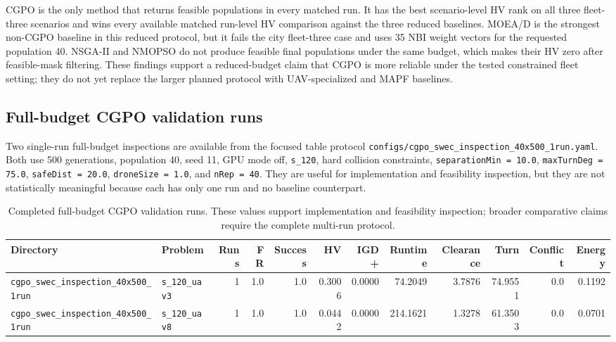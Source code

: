 \documentclass[a4paper,fleqn]{cas-dc}
\begin{document}
CGPO is the only method that returns feasible populations in every matched run. It has the best scenario-level HV rank on all three fleet-three scenarios and wins every available matched run-level HV comparison against the three reduced baselines. MOEA/D is the strongest non-CGPO baseline in this reduced protocol, but it fails the city fleet-three case and uses 35 NBI weight vectors for the requested population 40. NSGA-II and NMOPSO do not produce feasible final populations under the same budget, which makes their HV zero after feasible-mask filtering. These findings support a reduced-budget claim that CGPO is more reliable under the tested constrained fleet setting; they do not yet replace the larger planned protocol with UAV-specialized and MAPF baselines.

\subsection{Full-budget CGPO validation runs}

Two single-run full-budget inspections are available from the focused table protocol \texttt{configs/cgpo\_swec\_inspection\_40x500\_1run.yaml}. Both use 500 generations, population 40, seed 11, GPU mode off, \texttt{s\_120}, hard collision constraints, \texttt{separationMin = 10.0}, \texttt{maxTurnDeg = 75.0}, \texttt{safeDist = 20.0}, \texttt{droneSize = 1.0}, and \texttt{nRep = 40}. They are useful for implementation and feasibility inspection, but they are not statistically meaningful because each has only one run and no baseline counterpart.

\begin{table}[t]
\centering
\scriptsize
\caption{Completed full-budget CGPO validation runs. These values support implementation and feasibility inspection; broader comparative claims require the complete multi-run protocol.}
\label{tab:inspection}
\begin{tabular}{llrrrrrrrrrr}
\toprule
Directory & Problem & Runs & FR & Success & HV & IGD+ & Runtime & Clearance & Turn & Conflict & Energy \\
\midrule
\texttt{cgpo\_swec\_inspection\_40x500\_1run} & \texttt{s\_120\_uav3} & 1 & 1.0 & 1.0 & 0.3006 & 0.0000 & 74.2049 & 3.7876 & 74.9551 & 0.0 & 0.1192 \\
\texttt{cgpo\_swec\_inspection\_40x500\_1run} & \texttt{s\_120\_uav8} & 1 & 1.0 & 1.0 & 0.0442 & 0.0000 & 214.1621 & 1.3278 & 61.3503 & 0.0 & 0.0701 \\
\bottomrule
\end{tabular}
\end{table}
\end{document}

